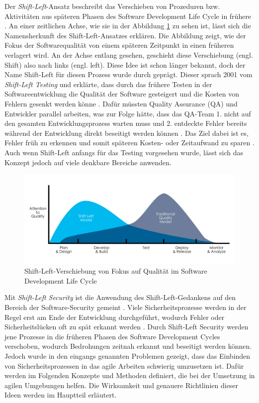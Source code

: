 Der \textit{Shift-Left}-Ansatz beschreibt das Verschieben von Prozeduren bzw. Aktivitäten aus späteren Phasen des Software Development Life Cycle in frühere \cite{andriadi_impact_2023}. An einer zeitlichen Achse, wie sie in der Abbildung \ref{fig:shiftleft } zu sehen ist, lässt sich die Namensherkunft des Shift-Left-Ansatzes erklären. Die Abbildung zeigt, wie der Fokus der Softwarequalität von einem späteren Zeitpunkt in einen früheren verlagert wird. An der Achse entlang gesehen, geschieht diese Verschiebung (engl. Shift) also nach links (engl. left). Diese Idee ist schon länger bekannt, doch der Name Shift-Left für diesen Prozess wurde durch \citet{smith_shift-left_2001} geprägt. Dieser sprach 2001 vom \textit{Shift-Left Testing} und erklärte, dass durch das frühere Testen in der Softwareentwicklung die Qualität der Software gesteigert und die Kosten von Fehlern gesenkt werden könne \cite{dawoud_better_2024}. Dafür müssten Quality Assurance (QA) und Entwickler parallel arbeiten, was zur Folge hätte, dass das QA-Team 1. nicht auf den gesamten Entwicklungsprozess warten muss und 2. entdeckte Fehler bereits während der Entwicklung direkt beseitigt werden können \cite{andriadi_impact_2023}. Das Ziel dabei ist es, Fehler früh zu erkennen und somit späteren Kosten- oder Zeitaufwand zu sparen \cite{dawoud_better_2024}. Auch wenn Shift-Left anfangs für das Testing vorgesehen wurde, lässt sich das Konzept jedoch auf viele denkbare Bereiche anwenden.

\begin{figure}
\centering
\includegraphics[width=0.9\linewidth]{images/Shift_Left.png}
\caption{Shift-Left-Verschiebung von Fokus auf Qualität im Software Development Life Cycle \cite{andriadi_impact_2023}}
\label{fig:shiftleft }
\end{figure}

Mit \textit{Shift-Left Security} ist die Anwendung des Shift-Left-Gedankens auf den Bereich der Software-Security gemeint \cite{dawoud_better_2024}. Viele Sicherheitsprozesse werden in der Regel erst am Ende der Entwicklung durchgeführt, wodurch Fehler oder Sicherheitslücken oft zu spät erkannt werden \cite{dawoud_better_2024}. Durch Shift-Left Security werden jene Prozesse in die früheren Phasen des Software Development Cycles verschoben, wodurch Bedrohungen zeitnah erkannt und beseitigt werden können. Jedoch wurde in den eingangs genannten Problemen gezeigt, dass das Einbinden von Sicherheitsprozessen in das agile Arbeiten schwierig umzusetzen ist. Dafür werden im Folgenden Konzepte und Methoden definiert, die bei der Umsetzung in agilen Umgebungen helfen. Die Wirksamkeit und genauere Richtlinien dieser Ideen werden im Hauptteil erläutert.

